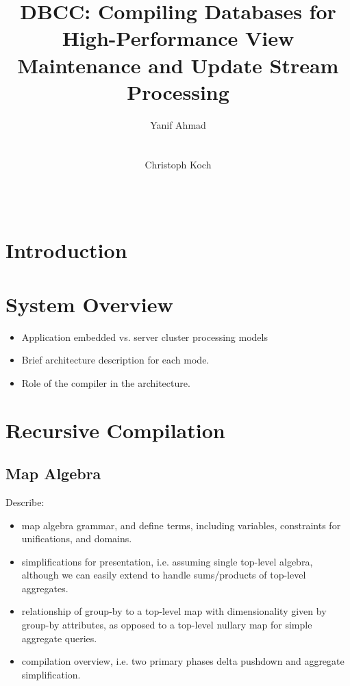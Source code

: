 \documentclass{sig-alternate}
\begin{document}
\title{DBCC: Compiling Databases for High-Performance View Maintenance and Update Stream Processing}
\author{
\alignauthor Yanif Ahmad\\
    \\
    \\
\alignauthor Christoph Koch\\
    \\
    \\
}
\maketitle

\section{Introduction}

\section{System Overview}

\begin{itemize}
\item Application embedded vs. server cluster processing models
\item Brief architecture description for each mode.
\item Role of the compiler in the architecture.
\end{itemize}

\section{Recursive Compilation}
\def\algsum{\mathrm{sum}}

\subsection{Map Algebra}
Describe:
\begin{itemize}
\item map algebra grammar, and define terms, including variables,
  constraints for unifications, and domains. 
\item simplifications for presentation, i.e. assuming single top-level
  algebra, although we can easily extend to handle sums/products of top-level
  aggregates.
\item relationship of group-by to a top-level map with dimensionality
  given by group-by attributes, as opposed to a top-level nullary map for simple
  aggregate queries.
\item compilation overview, i.e. two primary phases delta pushdown and
  aggregate simplification.
\end{itemize}
\end{document}
